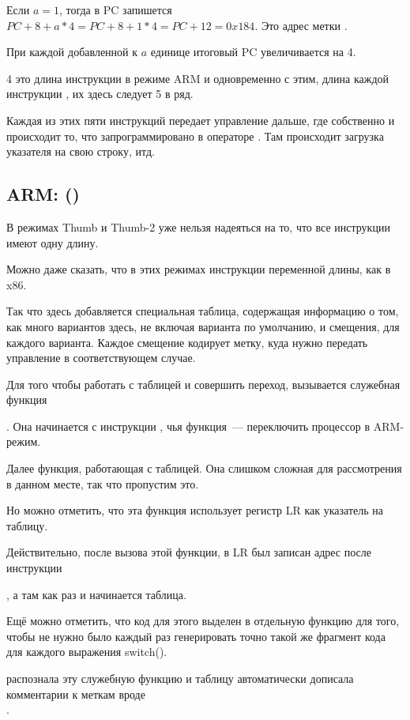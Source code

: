 Если $a=1$, тогда в \ac{PC} запишется 
$PC+8+a*4 = PC+8+1*4 = PC+12 = 0x184$. Это адрес метки .

При каждой добавленной к $a$ единице итоговый \ac{PC} увеличивается на 4.

4 это длина инструкции в режиме ARM и одновременно с этим, 
длина каждой инструкции , их здесь следует 5 в ряд.

Каждая из этих пяти инструкций  передает управление дальше, где собственно и происходит то, 
что запрограммировано в операторе .
Там происходит загрузка указателя на свою строку, итд.

\subsection{ARM: \OptimizingKeilVI (\ThumbMode)}



В режимах Thumb и Thumb-2 уже нельзя надеяться на то, что все инструкции имеют одну длину.

Можно даже сказать, что в этих режимах инструкции переменной длины, как в x86.

Так что здесь добавляется специальная таблица, содержащая информацию о том, как много вариантов здесь,
не включая варианта по умолчанию, и смещения, для каждого варианта. Каждое смещение кодирует метку, куда нужно передать
управление в соответствующем случае.

Для того чтобы работать с таблицей и совершить переход, вызывается служебная функция

. 
Она начинается с инструкции , чья функция~--- переключить процессор в ARM-режим.

Далее функция, работающая с таблицей. 
Она слишком сложная для рассмотрения в данном месте, так что пропустим это.


Но можно отметить, что эта функция использует регистр \ac{LR} как указатель на таблицу.

Действительно, после вызова этой функции, в \ac{LR} был записан адрес после инструкции

, а там как раз и начинается таблица.

Ещё можно отметить, что код для этого выделен в отдельную функцию для того, 
чтобы не нужно было каждый раз генерировать 
точно такой же фрагмент кода для каждого выражения switch().

\IDA распознала эту служебную функцию и таблицу автоматически дописала комментарии к меткам вроде \\
.

